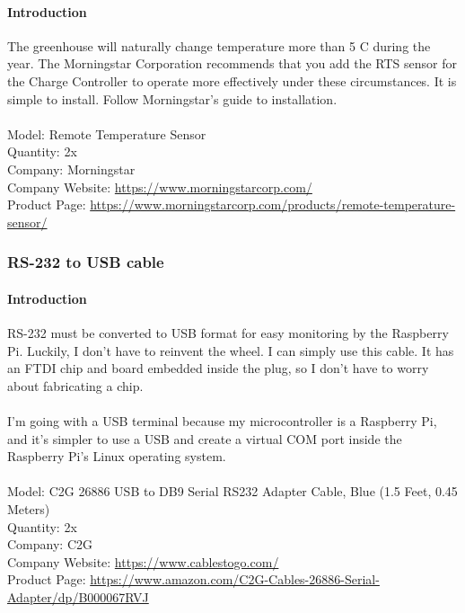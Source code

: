 \paragraph{Introduction}

The greenhouse will naturally change temperature more than 5 C during the year. The Morningstar Corporation recommends that you add the RTS sensor for the Charge Controller to operate more effectively under these circumstances. It is simple to install. Follow Morningstar’s guide to installation.\\
\\
Model: Remote Temperature Sensor\\
Quantity: 2x\\
Company: Morningstar\\
Company Website: \href{https://www.morningstarcorp.com/}{https://www.morningstarcorp.com/}\\
Product Page: \href{https://www.morningstarcorp.com/products/remote-temperature-sensor/}{https://www.morningstarcorp.com/products/remote-temperature-sensor/
}
\par

\subsubsection{RS-232 to USB cable}

\paragraph{Introduction}

RS-232 must be converted to USB format for easy monitoring by the Raspberry Pi. Luckily, I don’t have to reinvent the wheel. I can simply use this cable. It has an FTDI chip and board embedded inside the plug, so I don’t have to worry about fabricating a chip.\\
 \\
I’m going with a USB terminal because my microcontroller is a Raspberry Pi, and it’s simpler to use a USB and create a virtual COM port inside the Raspberry Pi’s Linux operating system.\\
 \\
Model: C2G 26886 USB to DB9 Serial RS232 Adapter Cable, Blue (1.5 Feet, 0.45 Meters)\\
Quantity: 2x\\
Company: C2G\\
Company Website: \href{https://www.cablestogo.com/}{https://www.cablestogo.com/} \\
Product Page: \href{https://www.amazon.com/C2G-Cables-26886-Serial-Adapter/dp/B000067RVJ}{https://www.amazon.com/C2G-Cables-26886-Serial-Adapter/dp/B000067RVJ}

